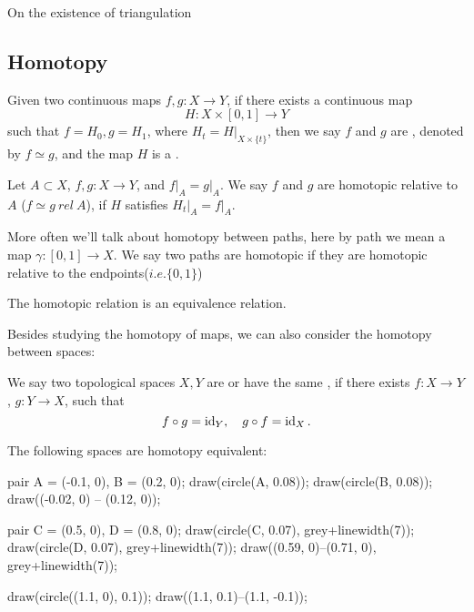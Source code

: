 \begin{remark}
    On the existence of triangulation
\end{remark}
\subsection{Homotopy}
\label{sub:Homotopy}
\begin{definition}[Homotopy]
	Given two continuous maps $f, g: X\to Y$, if there exists a continuous map
	\[
		H: X\times [0,1]\to Y
	\]
	such that $f = H_0, g = H_1$, where $H_t = H\big|_{X \times \{t\}}$,
	then we say $f$ and $g$ are , denoted by $f\simeq g$, and
	the map $H$ is a .
\end{definition}
\begin{definition}
	Let $A \subset X$, $f, g: X\to Y$, and $f\big|_A = g\big|_A$.
	We say $f$ and $g$ are homotopic relative to $A$ ($f\simeq g \ rel\ A$),
	if $H$ satisfies $H_t \big|_A = f\big|_A$.
\end{definition}

More often we'll talk about homotopy between paths, here by path
we mean a map $\gamma: [0, 1]\to X$. We say two paths are homotopic
if they are homotopic relative to the endpoints($i.e. \{0, 1\}$)

\begin{proposition}
	The homotopic relation is an equivalence relation.
\end{proposition}

Besides studying the homotopy of maps, we can also consider the homotopy between spaces:
\begin{definition}
	We say two topological spaces $X, Y$ are 
	or have the same , if there exists $f:X\to Y$, $g:Y\to X$,
	such that
	\[
		f\circ g = \operatorname{id}_Y,\quad g\circ f = \operatorname{id}_X.
	\]
\end{definition}
\begin{example}
    The following spaces are homotopy equivalent:

	\begin{center}
	\begin{asy}
	    pair A = (-0.1, 0), B = (0.2, 0);
		draw(circle(A, 0.08));
		draw(circle(B, 0.08));
		draw((-0.02, 0) -- (0.12, 0));

		pair C = (0.5, 0), D = (0.8, 0);
		draw(circle(C, 0.07), grey+linewidth(7));
		draw(circle(D, 0.07), grey+linewidth(7));
		draw((0.59, 0)--(0.71, 0), grey+linewidth(7));

		draw(circle((1.1, 0), 0.1)); draw((1.1, 0.1)--(1.1, -0.1));
	\end{asy}
	\end{center}

\end{example}

